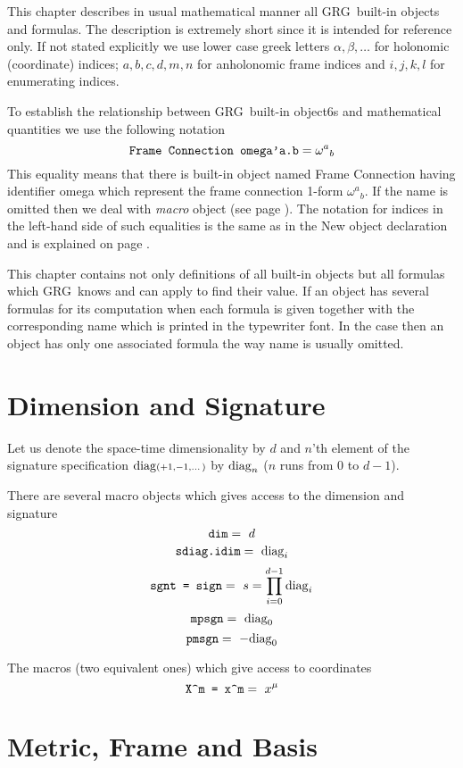 \documentclass[twoside,openright]{report}
\newcommand{\grgtt}{\ttfamily}
\newcommand{\object}[2]{%
\begin{equation}
\mbox{\comm{#1}} =\ #2
\end{equation}}
\renewcommand{\tt}{\grgtt}
\def\^{{\tt \char'136}}                     %
\newcommand{\grg}{{\sc GRG}}
\newcommand{\comm}[1]{{\upshape\tt#1}}    %
\begin{document}
This chapter describes in usual mathematical manner all \grg\
built-in objects and formulas. The description is extremely short
since it is intended for reference only.
If not stated explicitly we use lower case greek letters
${\scriptstyle  \alpha,\beta,\dots}$ for
holonomic (coordinate) indices; ${\scriptstyle a,b,c,d,m,n}$ for
anholonomic frame indices and ${\scriptstyle i,j,k,l}$
for enumerating indices.

To establish the relationship between \grg\ built-in object6s
and mathematical quantities we use the following notation
\[
\mbox{\tt Frame Connection omega'a.b} = \omega^a{}_b
\]
This equality means that there is built-in object named
{\tt Frame Connection} having identifier {\tt omega}
which represent the frame connection 1-form $\omega^a{}_b$.
If the name is omitted then we deal with \emph{macro} object
(see page \pageref{macro}). The notation for indices
in the left-hand side of such equalities is the same
as in the {\tt New object} declaration and
is explained on page \pageref{indices}.

This chapter contains not only definitions of all built-in
objects but all formulas which \grg\ knows and can apply
to find their value. If an object has
several formulas for its computation when each formula
is given together with the corresponding name which is printed
in the typewriter font.
In the case then an object has only one associated
formula the way name is usually omitted.


\section{Dimension and Signature}

Let us denote the space-time dimensionality by $d$
and $n$'th element of the signature specification
${\rm diag}{\scriptstyle(+1,-1,\dots)}$ by ${\rm diag}_n$
($n$ runs from 0 to $d-1$).

There are several macro objects which gives access to
the dimension and signature
\object{dim}{d}
\object{sdiag.idim}{{\rm diag}_i}
\object{sgnt \mbox{=} sign}{s=\prod^{d-1}_{i=0}{\rm diag}_i}
\object{mpsgn}{{\rm diag}_0}
\object{pmsgn}{-{\rm diag}_0}

The macros (two equivalent ones) which give access to
coordinates
\object{X\^m \mbox{=} x\^m}{x^\mu}


\section{Metric, Frame and Basis}
\end{document}
